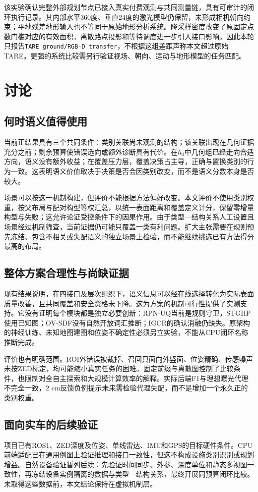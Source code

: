 \documentclass[11pt,a4paper]{article}
\begin{document}
该实验确认完整外部规划节点已接入真实付费观测与共同测量链，具有可审计的闭环执行记录。其内部水平360度、垂直24度的激光模型仍保留，未形成相机朝向约束；平地残差地形输入也不等同于原始地形分析系统。降采样密度改变了原固定点数门槛对应的有效面积，离散路点投影和等待调度进一步引入接口影响。因此本轮只报告\texttt{TARE ground/RGB-D transfer}，不根据这组差距声称本文超过原始TARE。更强的系统比较需另行验证视场、朝向、运动与地形模型的任务匹配。


\section{讨论}
\subsection{何时语义值得使用}
当前正结果具有三个共同条件：类别关联尚未观测的结构；该关联出现在几何证据充分之前；剩余预算使错误选向或额外诊断具有代价。在$h_0$中几何组已经走向合适方向，语义没有额外收益；在覆盖压力层，覆盖决策占主导，正确与置换类别的行为一致。这表明语义价值取决于决策是否会因类别改变，而不是语义分数本身是否较大。

场景可以按这一机制构建，但评价不能根据方法偏好改变。本文评价不使用类别权重，按父布局与配对构型等权汇总，以统一表面距离和覆盖定义计分，保留零增量构型与失败；这允许论证受控条件下的因果作用。由于类型—结构关系人工设置且场景经过机制筛查，当前证据仍可能只覆盖一类有利问题。扩大主张需要在规则预先冻结、包含不相关或失配语义的独立场景上检验，而不能继续挑选已有方法得分最高的布局。

\subsection{整体方案合理性与尚缺证据}
现有结果说明，在四接口及层次组织下，语义信息可以经在线选择转化为实际表面质量改善，且共同覆盖和安全资格未下降。这为方案的机制可行性提供了实测支持。它没有证明每个模块都是独立必要创新：RPN-UQ当前是规则守卫，STGHP使用已知图；OV-SDF没有自然开放词汇推断；IGCR的确认消融仍缺失。原架构的神经训练、未知地图建图和位姿不确定性必须另立实验，不能从CPU闭环名称推断完成。

评价也有明确范围。ROI外错误被裁掉、召回只面向外竖面、位姿精确、传感噪声未按ZED标定，均可能缩小真实任务的困难。固定前缀与离散图控制了比较条件，也限制对全自主探索和大规模计算效率的解释。实际后端F1与理想曝光代理不完全一致，2 cm反馈负例提示未来需检验代理失配，而不是增加一个永久正的类别权重。

\subsection{面向实车的后续验证}
项目已有ROS1、ZED深度及位姿、单线雷达、IMU和GPS的目标硬件条件。CPU前端适配已在通用例图上验证推理和接口一致性，但这不构成设施类别识别或规划增益。自然设备验证暂列后续：先验证时间同步、外参、深度单位和静态多视图一致性，再冻结设备实例隔离的数据与类型—结构关系，最终开展同预算闭环比较。未取得这些数据前，本文结论保持在虚拟机制层。
\end{document}
